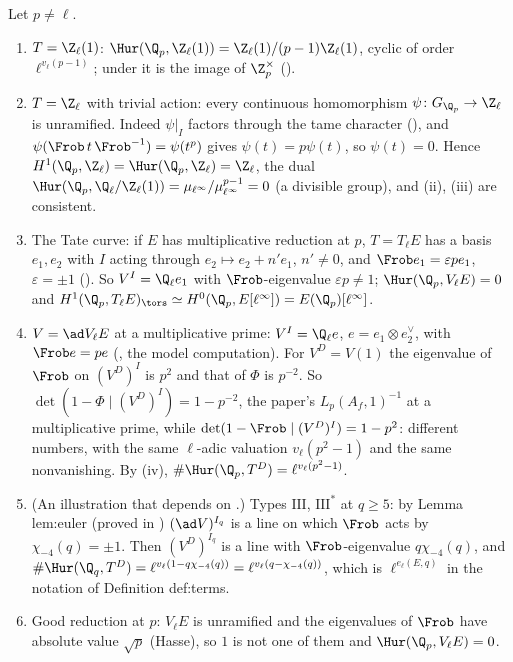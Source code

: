 \begin{example}\label{ex:galcoh:ur-examples}
Let $p\ne\ell$.
\begin{enumerate}[label=(\alph*)]
\item $T=\Z_\ell(1)$: $\Hur(\Q_p,\Z_\ell(1))=\Z_\ell(1)/(p-1)\Z_\ell(1)$, cyclic of order $\ell^{v_\ell(p-1)}$; under  it is the image of
$\Z_p^\times$ ().
\item $T=\Z_\ell$ with trivial action: every continuous homomorphism $\psi\colon G_{\Q_p}\to\Z_\ell$ is unramified. Indeed $\psi|_I$ factors through the tame character
(), and $\psi(\Frob\,t\,\Frob^{-1})=\psi(t^p)$ gives $\psi(t)=p\psi(t)$, so $\psi(t)=0$. Hence $H^1(\Q_p,\Z_\ell)=\Hur(\Q_p,\Z_\ell)=\Z_\ell$, the dual
$\Hur(\Q_p,\Q_\ell/\Z_\ell(1))=\mu_{\ell^\infty}/\mu_{\ell^\infty}^{p-1}=0$ (a divisible group), and (ii), (iii) are consistent.
\item The Tate curve: if $E$ has multiplicative reduction at $p$, $T=T_\ell E$ has a basis $e_1,e_2$ with $I$ acting through $e_2\mapsto e_2+n'e_1$, $n'\ne0$, and
$\Frob e_1=\varepsilon pe_1$, $\varepsilon=\pm1$ (). So $V^I=\Q_\ell e_1$ with $\Frob$-eigenvalue $\varepsilon p\ne1$; $\Hur(\Q_p,V_\ell E)=0$ and
$H^1(\Q_p,T_\ell E)_{\tors}\simeq H^0(\Q_p,E[\ell^\infty])=E(\Q_p)[\ell^\infty]$.
\item $V=\ad V_\ell E$ at a multiplicative prime: $V^I=\Q_\ell e$, $e=e_1\otimes e_2^\vee$, with $\Frob e=pe$ (, the model computation). For
$V^D=V(1)$ the eigenvalue of $\Frob$ on $(V^D)^I$ is $p^2$ and that of $\Phi$ is $p^{-2}$. So $\det(1-\Phi\mid(V^D)^I)=1-p^{-2}$, the paper's $L_p(A_f,1)^{-1}$ at a
multiplicative prime, while $\det(1-\Frob\mid(V^D)^I)=1-p^2$: different numbers, with the same $\ell$-adic valuation $v_\ell(p^2-1)$ and the same nonvanishing.
By (iv), $\#\Hur(\Q_p,T^D)=\ell^{v_\ell(p^2-1)}$.
\item (An illustration that depends on .) Types $\mathrm{III}$, $\mathrm{III}^*$ at $q\ge5$: by Lemma lem:euler (proved in ) $(\ad V)^{I_q}$ is a line on which $\Frob$ acts by
$\chi_{-4}(q)=\pm1$. Then $(V^D)^{I_q}$ is a line with $\Frob$-eigenvalue $q\chi_{-4}(q)$, and $\#\Hur(\Q_q,T^D)=\ell^{v_\ell(1-q\chi_{-4}(q))}=\ell^{v_\ell(q-\chi_{-4}(q))}$, which is
$\ell^{e_\ell(E,q)}$ in the notation of Definition def:terms.
\item Good reduction at $p$: $V_\ell E$ is unramified and the eigenvalues of $\Frob$ have absolute value $\sqrt p$ (Hasse), so $1$ is not one of them and
$\Hur(\Q_p,V_\ell E)=0$.
\end{enumerate}
\end{example}
